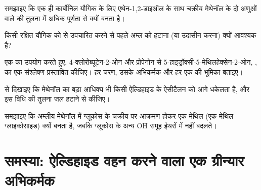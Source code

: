\begin{exercise}[$\star\star$]\label{exo:b1:acetals-protection:8}
समझाइए कि एक ही कार्बोनिल यौगिक के लिए एथेन-1,2-डाइऑल के साथ चक्रीय 
मेथेनॉल के दो अणुओं वाले  की तुलना में अधिक पूर्णता से क्यों
बनता है।
\end{exercise}

\begin{exercise}[$\star\star$]\label{exo:b1:acetals-protection:9}
किसी रक्षित यौगिक को  से उपचारित करने से पहले अम्ल  को
हटाना (या उदासीन करना) क्यों आवश्यक है?
\end{exercise}

\begin{exercise}[$\star\star\star$]\label{exo:b1:acetals-protection:10}
एक  का उपयोग करते हुए, 4-क्लोरोब्यूटेन-2-ओन और प्रोपेनोन से
5-हाइड्रॉक्सी-5-मेथिलहेक्सेन-2-ओन, , का एक संश्लेषण
प्रस्तावित कीजिए। हर चरण, उसके अभिकर्मक और हर एक की भूमिका बताइए।
\end{exercise}

\begin{exercise}[$\star\star\star$]\label{exo:b1:acetals-protection:11}
 से दिखाइए कि मेथेनॉल का बड़ा आधिक्य भी
किसी ऐल्डिहाइड के ऐसीटैलन को आगे धकेलता है, और इस विधि की तुलना
जल हटाने से कीजिए।
\end{exercise}

\begin{exercise}[$\star\star\star$]\label{exo:b1:acetals-protection:12}
समझाइए कि अम्लीय मेथेनॉल में ग्लूकोस के चक्रीय  पर आक्रमण होकर
एक मेथिल  (एक मेथिल ग्लाइकोसाइड) क्यों बनता है, जबकि ग्लूकोस के अन्य OH
समूह ईथरों में नहीं बदलते।
\end{exercise}

\section{समस्या: ऐल्डिहाइड वहन करने वाला एक ग्रीन्यार अभिकर्मक}


